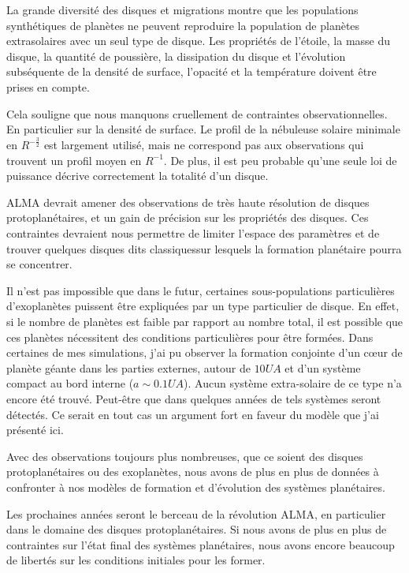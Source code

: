 \bigskip

La grande diversité des disques et migrations montre que les populations synthétiques de planètes ne peuvent reproduire la population de planètes extrasolaires avec un seul type de disque. Les propriétés de l'étoile, la masse du disque, la quantité de poussière, la dissipation du disque et l'évolution subséquente de la densité de surface, l'opacité et la température doivent être prises en compte. 

Cela souligne que nous manquons cruellement de contraintes observationnelles. En particulier sur la densité de surface. Le profil de la nébuleuse solaire minimale en $R^{-\frac{3}{2}}$ est largement utilisé, mais ne correspond pas aux observations qui trouvent un profil moyen en $R^{-1}$. De plus, il est peu probable qu'une seule loi de puissance décrive correctement la totalité d'un disque. 

ALMA devrait amener des observations de très haute résolution de disques protoplanétaires, et un gain de précision sur les propriétés des disques. Ces contraintes devraient nous permettre de limiter l'espace des paramètres et de trouver quelques disques dits \og classiques\fg sur lesquels la formation planétaire pourra se concentrer. 

Il n'est pas impossible que dans le futur, certaines sous-populations particulières d'exoplanètes puissent être expliquées par un type particulier de disque. En effet, si le nombre de planètes est faible par rapport au nombre total, il est possible que ces planètes nécessitent des conditions particulières pour être formées. Dans certaines de mes simulations, j'ai pu observer la formation conjointe d'un cœur de planète géante dans les parties externes, autour de $10\unit{UA}$ et d'un système compact au bord interne ($a\sim 0.1\unit{UA}$). Aucun système extra-solaire de ce type n'a encore été trouvé. Peut-être que dans quelques années de tels systèmes seront détectés. Ce serait en tout cas un argument fort en faveur du modèle que j'ai présenté ici. 

\bigskip

Avec des observations toujours plus nombreuses, que ce soient des disques protoplanétaires ou des exoplanètes, nous avons de plus en plus de données à confronter à nos modèles de formation et d'évolution des systèmes planétaires. 

Les prochaines années seront le berceau de la révolution ALMA, en particulier dans le domaine des disques protoplanétaires. Si nous avons de plus en plus de contraintes sur l'état final des systèmes planétaires, nous avons encore beaucoup de libertés sur les conditions initiales pour les former. 

